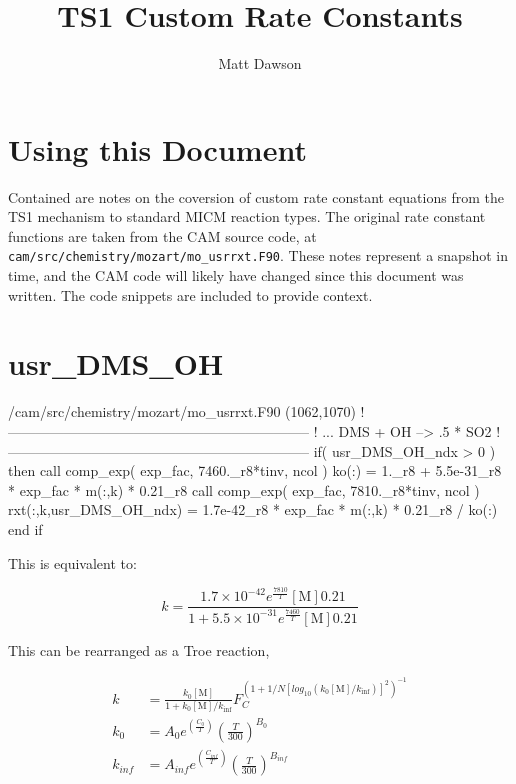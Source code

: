 \documentclass[titlepage]{article}
\begin{document}
\title{TS1 Custom Rate Constants}
\author{Matt Dawson}
\maketitle


\section{Using this Document}

Contained are notes on the coversion of custom rate constant equations
from the TS1 mechanism to standard MICM reaction types. The original
rate constant functions are taken from the CAM source code, at 
\verb>cam/src/chemistry/mozart/mo_usrrxt.F90>. These notes represent
a snapshot in time, and the CAM code will likely have changed since this
document was written. The code snippets are included to provide context. 


\section{usr\_DMS\_OH}

\begin{blockcode}[commandchars=\\\{\}]
\color{gray}/cam/src/chemistry/mozart/mo_usrrxt.F90 (1062,1070)
!-----------------------------------------------------------------
!       ... DMS + OH  --> .5 * SO2
!-----------------------------------------------------------------
       if( usr_DMS_OH_ndx > 0 ) then
          call comp_exp( exp_fac, 7460._r8*tinv, ncol )
          ko(:) = 1._r8 + 5.5e-31_r8 * exp_fac * m(:,k) * 0.21_r8
          call comp_exp( exp_fac, 7810._r8*tinv, ncol )
          rxt(:,k,usr_DMS_OH_ndx) = 1.7e-42_r8 * exp_fac * m(:,k) * 0.21_r8 / ko(:)
       end if
\end{blockcode}

This is equivalent to:

\begin{equation}
k = \frac{1.7 \times 10^{-42} e^{\frac{7810}{T}} [\mbox{M}] 0.21}{1 + 5.5 \times 10^{-31} e^{\frac{7460}{T}} [\mbox{M}] 0.21 }
\end{equation}

This can be rearranged as a Troe reaction,

\begin{equation}
\begin{split}
k & = \frac{k_0[\mbox{M}]}{1+k_0[\mbox{M}]/k_{\inf}}F_C^{(1+1/N[log_{10}(k_0[\mbox{M}]/k_{\inf})]^2)^{-1}} \\
k_0 & = A_0 e^{\left( \frac{C_0}{T} \right)} \left( \frac{T}{300} \right)^{B_0} \\
k_{inf} & = A_{inf} e^{\left( \frac{C_{inf}}{T} \right)} \left( \frac{T}{300} \right)^{B_{inf}}
\end{split}
\end{equation}
\end{document}

